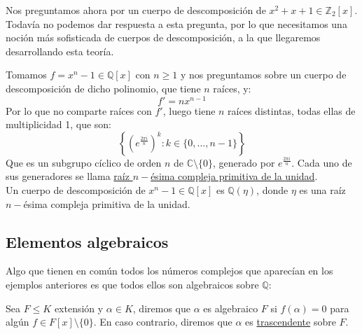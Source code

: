 \noindent
Nos preguntamos ahora por un cuerpo de descomposición de $x^2+x+1\in \mathbb{Z}_2[x]$. Todavía no podemos dar respuesta a esta pregunta, por lo que necesitamos una noción más sofisticada de cuerpos de descomposición, a la que llegaremos desarrollando esta teoría.

\begin{ejemplo}
    Tomamos $f=x^n-1\in \mathbb{Q}[x]$ con $n\geq 1$ y nos preguntamos sobre un cuerpo de descomposición de dicho polinomio, que tiene $n$ raíces, y:
    \begin{equation*}
        f' = nx^{n-1}
    \end{equation*}
    Por lo que no comparte raíces con $f'$, luego tiene $n$ raíces distintas, todas ellas de multiplicidad 1, que son:
    \begin{equation*}
        \left\{{\left(e^{\frac{2\pi i}{n}}\right)}^{k}:k\in \{0,\ldots,n-1\}\right\}
    \end{equation*}
    Que es un subgrupo cíclico de orden $n$ de $\mathbb{C}\setminus\{0\}$, generado por $e^{\frac{2\pi i}{n}}$. Cada uno de sus generadores se llama \underline{raíz $n-$ésima compleja primitiva de la unidad}.\\

    \noindent
    Un cuerpo de descomposición de $x^n-1\in \mathbb{Q}[x]$ es $\mathbb{Q}(\eta)$, donde $\eta$ es una raíz $n-$ésima compleja primitiva de la unidad.
\end{ejemplo}

\subsection{Elementos algebraicos}
\noindent
Algo que tienen en común todos los números complejos que aparecían en los ejemplos anteriores es que todos ellos son algebraicos sobre $\mathbb{Q}$:

\begin{definicion}
    Sea $F\leq K$ extensión y $\alpha\in K$, diremos que $\alpha$ es algebraico  $F$ si $f(\alpha)=0$ para algún $f\in F[x]\setminus\{0\}$. En caso contrario, diremos que $\alpha$ es \underline{trascendente} sobre $F$.
\end{definicion}

